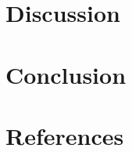 \documentclass[a4paper, 12pt]{article}
\begin{document}
\section{Discussion}

\section{Conclusion}


\section{References}
\newpage
\renewcommand*{\bibname}{\vspace{-20pt}\section{References}\vspace{-20pt}}


\end{document}
